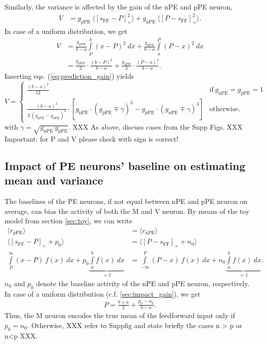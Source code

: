 \documentclass[10pt,a4paper,draft]{article}
\begin{document}
Similarly, the variance is affected by the gain of the nPE and pPE neuron,
%
\begin{align}
\label{eq:condition_variance_gain}
V &= g_\mathrm{pPE}\ \langle \left[ s_\mathrm{FF}-P \right]_+^2 \rangle + g_\mathrm{nPE}\ \langle \left[ P-s_\mathrm{FF} \right]_+^2 \rangle.
\end{align}
%
In case of a uniform distribution, we get
%
\begin{align}
V &= \frac{g_\mathrm{pPE}}{b-a} \int\limits_P^b (x-P)^2\ dx + \frac{g_\mathrm{nPE}}{b-a} \int\limits_a^P (P-x)^2\ dx \\
   &= \frac{g_\mathrm{pPE}}{3} \cdot \frac{(b-P)^3}{b-a} + \frac{g_\mathrm{nPE}}{3} \cdot \frac{(P-a)^3}{b-a}. \nonumber
\end{align}
%
Inserting eqs. (\ref{eq:prediction_gain}) yields
%
\begin{equation}
\label{eq:variance_gain}
    V=
    \begin{cases}
      \frac{(b - a)^2}{12} & \text{if}\ g_\mathrm{nPE} = g_\mathrm{pPE} = 1 \\
      \frac{(b-a)^2}{3\ (g_\mathrm{pPE} - g_\mathrm{nPE})^3} \cdot \left[ g_\mathrm{nPE} \cdot( g_\mathrm{pPE} \mp \gamma)^3 - g_\mathrm{pPE} \cdot (g_\mathrm{nPE} \mp \gamma)^3\right] & \text{otherwise.}
    \end{cases}
\end{equation}
%
with $\gamma = \sqrt{g_\mathrm{nPE}\ g_\mathrm{pPE}}$. 
XXX As above, discuss cases from the Supp Figs. XXX Important: for P and V please check with sign is correct!


\subsection{Impact of PE neurons' baseline on estimating mean and variance}
%
The baselines of the PE neurons, if not equal between nPE and pPE neuron on average, can bias the activity of both the M and V neuron. By means of the toy model from section \ref{sec:toy}, we can write
%
\begin{align}
\label{eq:condition_baseline_mean}
\langle r_\mathrm{pPE} \rangle &= \langle r_\mathrm{nPE} \rangle \\
\langle \left[s_\mathrm{FF} - P\right]_+ + p_0\rangle &= \langle \left[P - s_\mathrm{FF}\right]_+ + n_0\rangle \nonumber\\
\int\limits_P^\infty (x - P)\ f(x)\ dx + p_0 \underbrace{\int\limits_a^b f(x)\ dx}_{=1}  &= \int\limits_{-\infty}^P (P - x)\ f(x)\ dx + n_0 \underbrace{\int\limits_a^b f(x)\ dx}_{=1} . \nonumber
\end{align}
%
$n_0$ and $p_0$ denote the baseline activity of the nPE and pPE neuron, respectively.
In case of a uniform distribution (c.f. \ref{sec:impact_gain}), we get 
%
%
\begin{align}
\label{eq:condition_baseline_mean_1}
P = \frac{b+a}{2} + \frac{p_0 - n_0}{b-a}.
\end{align}
%
Thus, the M neuron encodes the true mean of the feedforward input only if $p_0 = n_0$. Otherwise, XXX refer to Suppfig and state briefly the cases n > p or n<p XXX.
\end{document}
